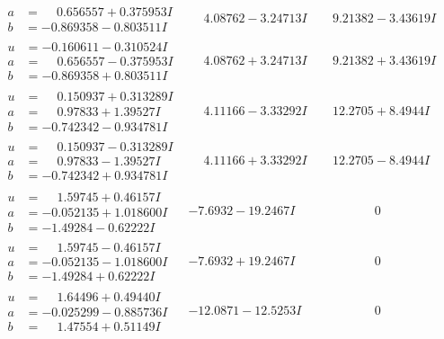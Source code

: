 \documentclass[1p]{elsarticle_modified}
\theoremstyle{definition}
\begin{document}
$$\begin{array}{c|c|c}
\begin{aligned}
a &= \phantom{-}0.656557 + 0.375953 I \\
b &= -0.869358 - 0.803511 I\end{aligned}
 & \phantom{-}4.08762 - 3.24713 I & \phantom{-}9.21382 - 3.43619 I \\ \hline\begin{aligned}
u &= -0.160611 - 0.310524 I \\
a &= \phantom{-}0.656557 - 0.375953 I \\
b &= -0.869358 + 0.803511 I\end{aligned}
 & \phantom{-}4.08762 + 3.24713 I & \phantom{-}9.21382 + 3.43619 I \\ \hline\begin{aligned}
u &= \phantom{-}0.150937 + 0.313289 I \\
a &= \phantom{-}0.97833 + 1.39527 I \\
b &= -0.742342 - 0.934781 I\end{aligned}
 & \phantom{-}4.11166 - 3.33292 I & \phantom{-}12.2705 + 8.4944 I \\ \hline\begin{aligned}
u &= \phantom{-}0.150937 - 0.313289 I \\
a &= \phantom{-}0.97833 - 1.39527 I \\
b &= -0.742342 + 0.934781 I\end{aligned}
 & \phantom{-}4.11166 + 3.33292 I & \phantom{-}12.2705 - 8.4944 I \\ \hline\begin{aligned}
u &= \phantom{-}1.59745 + 0.46157 I \\
a &= -0.052135 + 1.018600 I \\
b &= -1.49284 - 0.62222 I\end{aligned}
 & -7.6932 - 19.2467 I & \phantom{-0.000000 } 0 \\ \hline\begin{aligned}
u &= \phantom{-}1.59745 - 0.46157 I \\
a &= -0.052135 - 1.018600 I \\
b &= -1.49284 + 0.62222 I\end{aligned}
 & -7.6932 + 19.2467 I & \phantom{-0.000000 } 0 \\ \hline\begin{aligned}
u &= \phantom{-}1.64496 + 0.49440 I \\
a &= -0.025299 - 0.885736 I \\
b &= \phantom{-}1.47554 + 0.51149 I\end{aligned}
 & -12.0871 - 12.5253 I & \phantom{-0.000000 } 0\\

\end{array}$$
\end{document}
